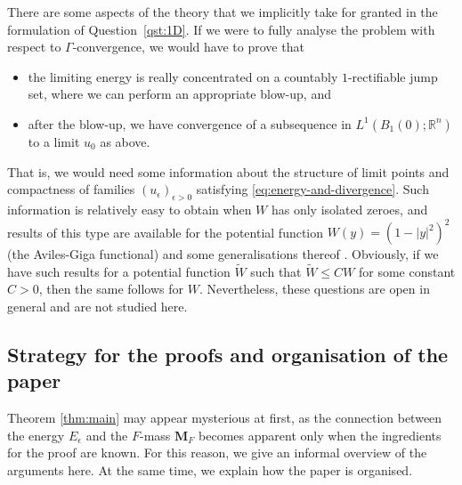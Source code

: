 \documentclass[a4paper]{article}
\newcommand{\R}{\mathbb{R}}
\newcommand{\M}{\mathbf{M}}
\theoremstyle{definition}
\theoremstyle{remark}
\begin{document}
There are some aspects of the theory that we implicitly take for granted in the formulation
of Question~\ref{qst:1D}. If we were to fully analyse the problem with respect to $\Gamma$-convergence, we would have to prove that
\begin{itemize}
\item the limiting energy is really concentrated on a countably $1$-rectifiable jump set,
where we can perform an appropriate blow-up, and
\item after the blow-up, we have convergence of a subsequence in $L^1(B_1(0); \R^n)$ to a limit $u_0$ as above.
\end{itemize}
That is, we would need some information about the structure of limit points and compactness of families
$(u_\epsilon)_{\epsilon > 0}$ satisfying \eqref{eq:energy-and-divergence}. Such information is relatively
easy to obtain when $W$ has only isolated zeroes, and results of this type are available for the potential function
$W(y) = (1 - |y|^2)^2$ (the Aviles-Giga functional) \cite{DeLellis-Otto:03, DeSimone-Kohn-Mueller-Otto:01}
and some generalisations thereof \cite{Bochard-Pegon:17, Lamy-Lorent-Peng:22}. Obviously, if we have such
results for a potential function $\tilde{W}$ such that $\tilde{W} \le CW$ for some constant $C > 0$, then the same follows for
$W$. Nevertheless, these questions are open in general and are not studied here.






\subsection{Strategy for the proofs and organisation of the paper}

Theorem \ref{thm:main} may appear mysterious at first, as the connection between the
energy $E_\epsilon$ and the $F$-mass $\M_F$ becomes apparent only when the
ingredients for the proof are known. For this reason, we give an informal overview
of the arguments here. At the same time, we explain how the paper is organised.
\end{document}
